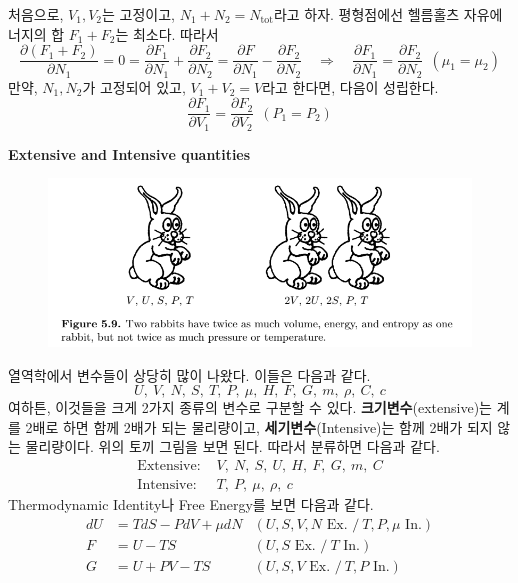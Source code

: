 \documentclass{article}
\begin{document}
\noindent
처음으로, $V_1, V_2$는 고정이고, $N_1 + N_2 = N_{\text{tot}}$라고 하자. 평형점에선 헬름홀츠 자유에너지의 합 $F_1 + F_2$는 최소다. 따라서
\begin{equation}
    \frac{\partial (F_1 + F_2)}{\partial N_1} = 0 = \frac{\partial F_1}{\partial N_1} + \frac{\partial F_2}{\partial N_2} = \frac{\partial F}{\partial N_1} - \frac{\partial F_2}{\partial N_2} \quad \Rightarrow \quad \frac{\partial F_1}{\partial N_1} = \frac{\partial F_2}{\partial N_2} \ \ (\mu_1 = \mu_2)
\end{equation}
만약, $N_1, N_2$가 고정되어 있고, $V_1 + V_2 = V$라고 한다면, 다음이 성립한다.
\begin{equation}
    \frac{\partial F_1}{\partial V_1} = \frac{\partial F_2}{\partial V_2} \ \ (P_1 = P_2)
\end{equation}

\newpage

\noindent
\textbf{Extensive and Intensive quantities}

\begin{figure}[h]
    \centering
    \includegraphics[width=0.7\linewidth]{images/fig2_3.png}
\end{figure}

열역학에서 변수들이 상당히 많이 나왔다. 이들은 다음과 같다.
\begin{equation*}
    U, \ V, \ N, \ S, \ T, \ P, \ \mu, \ H, \ F, \ G, \ m, \ \rho, \ C, \ c
\end{equation*}
 여하튼, 이것들을 크게 2가지 종류의 변수로 구분할 수 있다. \textbf{크기변수}(extensive)는 계를 2배로 하면 함께 2배가 되는 물리량이고, \textbf{세기변수}(Intensive)는 함께 2배가 되지 않는 물리량이다. 위의 토끼 그림을 보면 된다. 따라서 분류하면 다음과 같다.
\begin{align*}
    \text{Extensive: }&V, \ N, \ S, \ U, \ H, \ F, \ G, \ m,\ C \\
    \text{Intensive: }&T, \ P, \ \mu, \ \rho, \ c
\end{align*}
Thermodynamic Identity나 Free Energy를 보면 다음과 같다.
\begin{align}
    dU &= TdS - PdV + \mu dN &(U, S, V, N \text{ Ex. } / \ T, P, \mu \text{ In.})\\
    F &= U - TS &(U, S \text{ Ex. } / \ T \text{ In.})\\
    G &= U + PV - TS &(U, S, V \text{ Ex. } / \ T, P \text{ In.})
\end{align}
\end{document}
